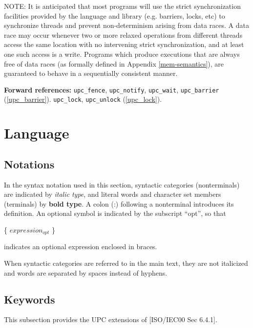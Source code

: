 \documentclass[12pt,titlepage]{article}
\newcounter{parnum}
\newcommand\np{\addtocounter{parnum}{1}\hspace{-2em}\makebox[2em][l]{\arabic{parnum}}}
\begin{document}
\np NOTE: It is anticipated that most programs will use the strict 
  synchronization facilities provided by the
  language and library (e.g. barriers, locks, etc) to synchronize threads and
  prevent non-determinism arising from data races. A data race may occur whenever
  two or more relaxed operations from different threads access the same location
  with no intervening strict synchronization, and at least one such access is a
  write. Programs which produce executions that are always free of data races (as
  formally defined in Appendix \ref{mem-semantics}), are guaranteed to behave in
  a sequentially consistent manner.

   {\bf Forward references:} {\tt upc\_fence}, {\tt upc\_notify}, 
    {\tt upc\_wait}, {\tt upc\_barrier} (\ref{upc_barrier}). {\tt upc\_lock},
    {\tt upc\_unlock} (\ref{upc_lock}).
    
\pagebreak
\section{Language}
\subsection{Notations} 

\np In the syntax notation used in this section, syntactic
    categories (nonterminals) are indicated by {\em italic type}, and
    literal words and character set members (terminals) by {\bf bold
    type}. A colon (:) following a nonterminal introduces its
    definition.  An optional symbol is
    indicated by the subscript ``opt'', so that

\begin{center}
          \{ $expression_{opt}$ \}
\end{center}

    indicates an optional expression enclosed in braces. 

\np When syntactic categories are referred to in the main
    text, they are not italicized and words are separated by spaces
    instead of hyphens.
    
\subsection {Keywords}

\np This subsection provides the UPC extensions of [ISO/IEC00 Sec 6.4.1].
\end{document}
